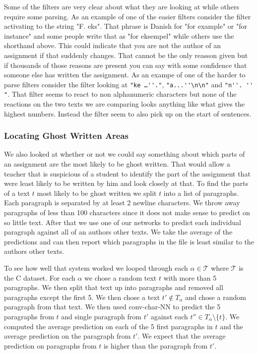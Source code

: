 Some of the filters are very clear about what they are looking at while others
require some parsing. As an example of one of the easier filters consider
the filter activating to the string "F. eks". That phrase is Danish for "for
example" or "for instance" and some people write that as "for eksempel" while
others use the shorthand above. This could indicate that you are not the author
of an assignment if that suddenly changes. That cannot be the only reasson
given but if thousands of those reasons are present you can say with some
confidence that someone else has written the assignment. As an exampe of one of
the harder to parse filters consider the filter looking at \verb["ke …''."[,
\verb["a...''\n\n"[ and \verb["n''. '' "[. That filter seems to react to non
alphanumeric characters but none of the reactions on the two texts we are
comparing looks anything like what gives the highest numbers. Instead the filter
seem to also pick up on the start of sentences.


\subsubsection{Locating Ghost Written Areas}

We also looked at whether or not we could say something about which parts of an
assignment are the most likely to be ghost written. That would allow a teacher
that is suspicious of a student to identify the part of the assignment that
were least likely to be written by him and look closely at that. To find the
parts of a text $t$ most likely to be ghost written we split $t$ into a list of
paragraphs. Each paragraph is separated by at least 2 newline characters. We
throw away paragraphs of less than 100 characters since it does not make sense
to predict on so little text. After that we use one of our networks to predict
each individual paragraph against all of an authors other texts. We take the
average of the predictions and can then report which paragraphs in the file is
least similar to the authors other texts.

To see how well that system worked we looped through each $\alpha \in
\mathcal{T}$ where $\mathcal{T}$ is the \gls{C} dataset. For each $\alpha$ we
chose a random text $t$ with more than 5 paragraphs. We then split that text up
into paragraphs and removed all paragraphs except the first 5. We then chose
a text $t' \not\in T_\alpha$ and chose a random paragraph from that text. We
then used \gls{conv-char-NN} to predict the 5 paragraphs from $t$ and single
paragraph from $t'$ against each $t'' \in T_\alpha \setminus \{t\}$. We computed
the average prediction on each of the 5 first paragraphs in $t$ and the average
prediction on the paragraph from $t'$. We expect that the average prediction on
paragraphs from $t$ is higher than the paragraph from $t'$.

